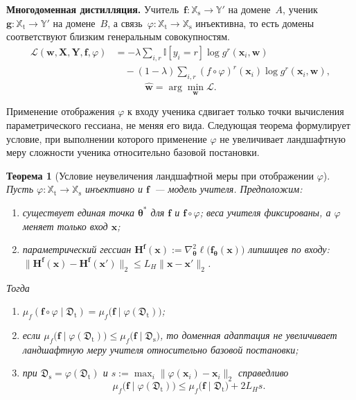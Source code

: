 \documentclass{dissert}
\newcommand{\paragraph}[1]{\noindent\textbf{#1}\quad}
\newtheorem{theorem}{Теорема}
\begin{document}
\paragraph{Многодоменная дистилляция.}
Учитель~$\mathbf{f}:\mathbb{X}_{\mathrm{s}}\to\mathbb{Y}'$ на домене~$A$, ученик~$\mathbf{g}:\mathbb{X}_{\mathrm{t}}\to\mathbb{Y}'$ на домене~$B$, а связь~$\varphi:\mathbb{X}_{\mathrm{t}}\to\mathbb{X}_{\mathrm{s}}$ инъективна, то есть домены соответствуют близким генеральным совокупностям.
\[
\begin{aligned}
    \mathcal{L}(\mathbf{w},\mathbf{X},\mathbf{Y},\mathbf{f},\varphi)
    &=
    -\lambda\sum_{i,r}\mathbb{I}[y_i=r]\log g^r(\mathbf{x}_i,\mathbf{w})\\
    &\quad
    -(1-\lambda)\sum_{i,r}(f\circ\varphi)^r(\mathbf{x}_i)\log g^r(\mathbf{x}_i,\mathbf{w}),
\end{aligned}
\]
\[
\hat{\mathbf{w}}=\arg\min_{\mathbf{w}}\mathcal{L}.
\]

Применение отображения $\varphi$ к входу ученика сдвигает только точки вычисления параметрического гессиана, не меняя его вида.
Следующая теорема формулирует условие, при выполнении которого применение $\varphi$ не увеличивает ландшафтную меру сложности ученика относительно базовой постановки.

\begin{theorem}[Условие неувеличения ландшафтной меры при отображении $\varphi$]
Пусть $\varphi:\mathbb{X}_{\text{t}}\to\mathbb{X}_{\text{s}}$ инъективно и $\mathbf{f}$~--- модель учителя.
Предположим:
\begin{enumerate}[1)]
    \item существует единая точка $\boldsymbol{\theta}^*$ для $\mathbf{f}$ и $\mathbf{f}\circ\varphi$; веса учителя фиксированы, а $\varphi$ меняет только вход $\mathbf{x}$;
    \item параметрический гессиан $\mathbf{H}^{\mathbf{f}}(\mathbf{x}):=\nabla^2_{\boldsymbol{\theta}}\ell\bigl(\mathbf{f}_{\boldsymbol{\theta}}(\mathbf{x})\bigr)$ липшицев по входу: $\bigl\|\mathbf{H}^{\mathbf{f}}(\mathbf{x})-\mathbf{H}^{\mathbf{f}}(\mathbf{x}')\bigr\|_2\le L_H\|\mathbf{x}-\mathbf{x}'\|_2$.
\end{enumerate}
Тогда
\begin{enumerate}[1)]
    \item $\mu_f(\mathbf{f}\circ\varphi\mid\mathfrak{D}_{\text{t}})=\mu_f\bigl(\mathbf{f}\mid\varphi(\mathfrak{D}_{\text{t}})\bigr)$;
    \item если $\mu_f\bigl(\mathbf{f}\mid\varphi(\mathfrak{D}_{\text{t}})\bigr)\le\mu_f\bigl(\mathbf{f}\mid\mathfrak{D}_{\text{s}}\bigr)$, то доменная адаптация не увеличивает ландшафтную меру учителя относительно базовой постановки;
    \item при $\mathfrak{D}_{\text{s}}=\varphi(\mathfrak{D}_{\text{t}})$ и $s:=\max_i\|\varphi(\mathbf{x}_i)-\mathbf{x}_i\|_2$ справедливо
    \[
        \mu_f\bigl(\mathbf{f}\mid\varphi(\mathfrak{D}_{\text{t}})\bigr)\le\mu_f\bigl(\mathbf{f}\mid\mathfrak{D}_{\text{t}}\bigr)+2L_H s .
    \]
\end{enumerate}
\end{theorem}
\end{document}
